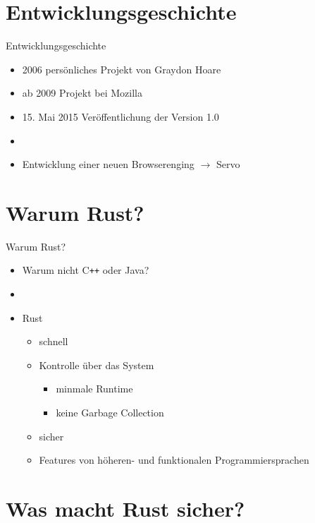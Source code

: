\documentclass[12pt]{beamer}
\begin{document}
\section{Entwicklungsgeschichte}

\begin{frame}{Entwicklungsgeschichte}
	\begin{itemize}
	  \item 2006 persönliches Projekt von Graydon Hoare
	  \item ab 2009 Projekt bei Mozilla
	  \item 15. Mai 2015 Veröffentlichung der Version 1.0
	  \item[]
	  \item Entwicklung einer neuen Browserenging $\rightarrow$ Servo
	 \end{itemize}	 
\end{frame}

\section{Warum Rust?}

\begin{frame}{Warum Rust?}
	\begin{itemize}
	  \item Warum nicht C\texttt{++} oder Java?
	  \item[]
	  \item Rust
	  \begin{itemize}
	      \item schnell
	      \item Kontrolle über das System
	      \begin{itemize}
	          \item minmale Runtime
	          \item keine Garbage Collection
	      \end{itemize}
	      \item sicher	      
	      \item Features von höheren- und funktionalen Programmiersprachen
	  \end{itemize}
	  \end{itemize}
\end{frame}

\section{Was macht Rust sicher?}
\end{document}
